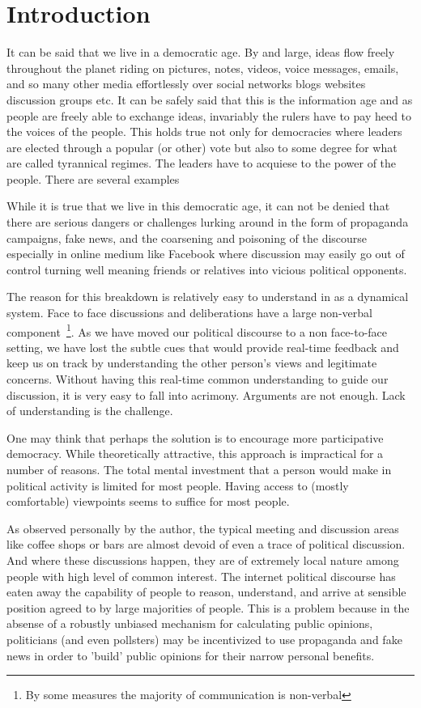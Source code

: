 
\section{Introduction} \label{section:Introduction}
It can be said that we live in a democratic age.
By and large, ideas flow freely throughout the planet riding
on pictures, notes, videos, voice messages, emails, and so
many other media effortlessly over social networks blogs
websites discussion groups etc.
It can be safely said that this is the information age and
as people are freely able to exchange ideas, invariably the rulers
have to pay heed to the voices of the people.
This holds true not only for democracies where leaders are elected
through a popular (or other) vote but also to some degree for
what are called tyrannical regimes. The leaders have to acquiese to
the power of the people.  There are several examples~\cite{}

While it is true that we live in this democratic age, it can not be
denied that there are serious dangers or challenges lurking around
in the form of propaganda campaigns, fake news, and the coarsening
and poisoning of the discourse especially in  online medium like
Facebook where discussion may easily go out of control turning
well meaning friends or relatives into vicious political opponents.

The reason for this breakdown is relatively easy to understand in
as a dynamical system.
Face to face discussions and deliberations have a large non-verbal
component~\footnote{By some measures the majority of communication is
  non-verbal}.
As we have moved our political discourse to a non face-to-face setting,
we have lost the subtle cues that would provide real-time feedback
and keep us on track by understanding the other person's views and
legitimate concerns.
Without having this real-time common understanding to guide our 
discussion, it is very easy to fall into acrimony.
Arguments are not enough.  Lack of understanding is the challenge.

One may think that perhaps the solution is to
encourage more participative democracy.
While theoretically attractive, this approach
is impractical for a number of reasons. The total mental
investment that a person would make in political activity is
limited for most people.
Having access to (mostly comfortable) viewpoints seems to suffice
for most people.

As observed personally by the author,  the typical meeting and
discussion areas like coffee shops or bars are almost devoid
of even a trace of political discussion.  And where these discussions
happen, they are of extremely local nature among people with high level
of common interest.  The internet political discourse has eaten away
the capability of people to reason, understand, and arrive at
sensible position agreed to by large majorities of people.  This is a
problem because in the absense of a robustly unbiased mechanism
for calculating public opinions,
politicians (and even pollsters) may be incentivized to use
propaganda and fake news in order to 'build' public opinions
for their narrow personal benefits.

